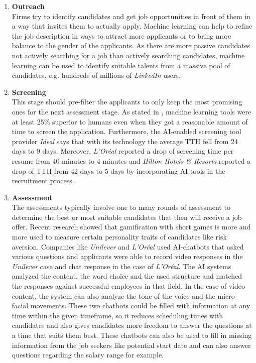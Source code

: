 \documentclass[draft,final]{thesisclass} %
\begin{document}
\begin{enumerate}
    \item \textbf{Outreach}\\
    Firms try to identify candidates and get job opportunities in front of them in a way that invites them to
    actually apply. Machine learning can help to refine the job description in ways to attract more applicants or to bring more balance to the gender of the applicants. As there are more passive candidates not actively searching for a job than actively searching candidates, machine learning can be used to identify suitable talents from a massive pool of candidates, e.g. hundreds of millions of \textit{LinkedIn} users.
    \item \textbf{Screening}\\
    This stage should pre-filter the applicants to only keep the most promising ones for the next assessment stage.
    As stated in \textcite[6]{ai_recruiting}, machine learning tools were at least 25\% superior to humans even when they got a reasonable amount of time to screen the application. Furthermore, the \acs{AI}-enabled screening tool provider \textit{Ideal} says that with its technology the average \gls{TTH} fell from 24 days to 9 days.
    Moreover, \textit{L'Oréal} reported a drop of screening time per resume from 40 minutes to 4 minutes and \textit{Hilton Hotels \& Resorts} reported a drop of \gls{TTH} from 42 days to 5 days by incorporating \acs{AI} tools in the recruitment process.
    \item \textbf{Assessment}\\
    The assessments typically involve one to many rounds of assessment to determine the best or most suitable candidates that then will receive a job offer. Recent research showed that gamification with short games is more and more used to measure certain personality traits of candidates like risk aversion. Companies like \textit{Unilever} and \textit{L'Oréal} used \acs{AI}-chatbots that asked various questions and applicants were able to record video responses in the \textit{Unilever} case and chat response in the case of \textit{L'Oréal}. The \acs{AI} systems analyzed the content, the word choice and the used structure and matched the responses against successful employees in that field. In the case of video content, the system can also analyze the tone of the voice and the micro-facial movements. These two chatbots could be filled with information at any time within the given timeframe, so it reduces scheduling times with candidates and also gives candidates more freedom to answer the questions at a time that suits them best. These chatbots can also be used to fill in missing information from the job seekers like potential start date and can also answer questions regarding the salary range for example.

\end{enumerate}
\end{document}
